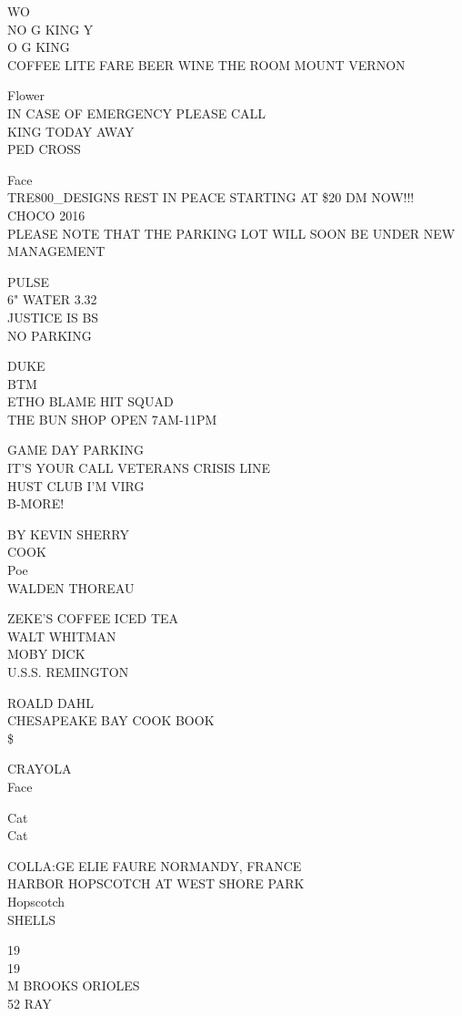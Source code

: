 \documentclass[10pt,letterpaper]{article}
\begin{document}
WO\\
NO G KING Y\\
O G KING\\
COFFEE LITE FARE BEER WINE THE ROOM MOUNT VERNON

Flower\\
IN CASE OF EMERGENCY PLEASE CALL\\
KING TODAY AWAY\\
PED CROSS

Face\\
TRE800\_DESIGNS REST IN PEACE STARTING AT \$20 DM NOW!!!\\
CHOCO 2016\\
PLEASE NOTE THAT THE PARKING LOT WILL SOON BE UNDER NEW MANAGEMENT

PULSE\\
6" WATER 3.32\\
JUSTICE IS BS\\
NO PARKING

DUKE\\
BTM\\
ETHO BLAME HIT SQUAD\\
THE BUN SHOP OPEN 7AM{-}11PM

GAME DAY PARKING\\
IT'S YOUR CALL VETERANS CRISIS LINE\\
HUST CLUB I'M VIRG\\
B{-}MORE!

BY KEVIN SHERRY\\
COOK\\
Poe\\
WALDEN THOREAU

ZEKE'S COFFEE ICED TEA\\
WALT WHITMAN\\
MOBY DICK\\
U.S.S. REMINGTON

ROALD DAHL\\
CHESAPEAKE BAY COOK BOOK\\
\$

CRAYOLA\\
Face

Cat\\
Cat

COLLA:GE ELIE FAURE NORMANDY, FRANCE\\
HARBOR HOPSCOTCH AT WEST SHORE PARK\\
Hopscotch\\
SHELLS

19\\
19\\
M BROOKS ORIOLES\\
52 RAY
\end{document}
